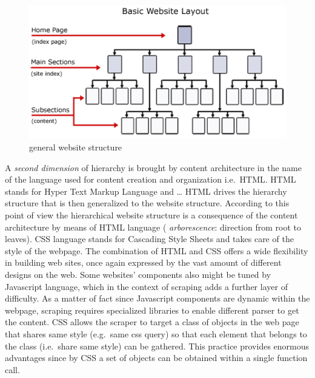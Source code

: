 \documentclass[
  12pt,
  a4paper,
  oneside]{book}
\begin{document}
\begin{figure}
\centering
\includegraphics{images/content-vs-html-title.png}
\caption{general website structure}
\end{figure}

A \emph{second dimension} of hierarchy is brought by content architecture in the name of the language used for content creation and organization i.e.~HTML. HTML stands for Hyper Text Markup Language and \ldots{}
HTML drives the hierarchy structure that is then generalized to the website structure. According to this point of view the hierarchical website structure is a consequence of the content architecture by means of HTML language ( \emph{arborescence}: direction from root to leaves).
CSS language stands for Cascading Style Sheets and takes care of the style of the webpage. The combination of HTML and CSS offers a wide flexibility in building web sites, once again expressed by the vast amount of different designs on the web. Some websites' components also might be tuned by Javascript language, which in the context of scraping adds a further layer of difficulty. As a matter of fact since Javascript components are dynamic within the webpage, scraping requires specialized libraries to enable different parser to get the content. CSS allows the scraper to target a class of objects in the web page that shares same style (e.g.~same css query) so that each element that belongs to the class (i.e.~share same style) can be gathered. This practice provides enormous advantages since by CSS a set of objects can be obtained within a single function call.
\end{document}
